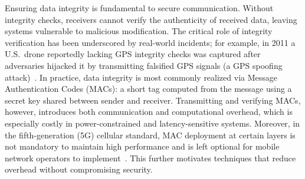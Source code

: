 




Ensuring data integrity is fundamental to secure communication. Without integrity checks, receivers cannot verify the authenticity of received data, leaving systems vulnerable to malicious modification. The critical role of integrity verification has been underscored by real-world incidents; for example, in 2011 a U.S.\ drone reportedly lacking GPS integrity checks was captured after adversaries hijacked it by transmitting falsified GPS signals (a GPS spoofing attack)~\cite{drone_gps_spoofing}. In practice, data integrity is most commonly realized via Message Authentication Codes (MACs): a short tag computed from the message using a secret key shared between sender and receiver. Transmitting and verifying MACs, however, introduces both communication and computational overhead, which is especially costly in power-constrained and latency-sensitive systems. Moreover, in the fifth-generation (5G) cellular standard, MAC deployment at certain layers is not mandatory to maintain high performance and is left optional for mobile network operators to implement~\cite{etsi_ts_133501_v17_5_0,5G_criticality}. This further motivates techniques that reduce overhead without compromising security.

